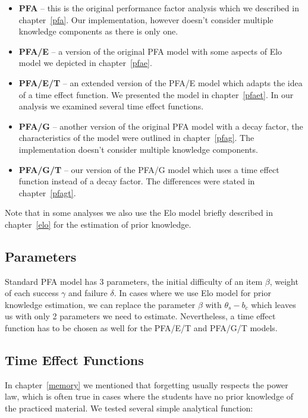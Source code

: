 \begin{itemize}
  \item \textbf{PFA} -- this is the original performance factor analysis which we described in chapter~\ref{pfa}. Our implementation, however doesn't consider multiple knowledge components as there is only one.
  \item \textbf{PFA/E} -- a version of the original PFA model with some aspects of Elo model we depicted in chapter~\ref{pfae}.
  \item \textbf{PFA/E/T} -- an extended version of the PFA/E model which adapts the idea of a time effect function. We presented the model in chapter~\ref{pfaet}. In our analysis we examined several time effect functions.
  \item \textbf{PFA/G} -- another version of the original PFA model with a decay factor, the characteristics of the model were outlined in chapter~\ref{pfag}. The implementation doesn't consider multiple knowledge components.
  \item \textbf{PFA/G/T} -- our version of the PFA/G model which uses a time effect function instead of a decay factor. The differences were stated in chapter~\ref{pfagt}.
\end{itemize}

Note that in some analyses we also use the Elo model briefly described in chapter~\ref{elo} for the estimation of prior knowledge.

\subsection{Parameters}

Standard PFA model has 3 parameters, the initial difficulty of an item $\beta$, weight of each success $\gamma$ and failure $\delta$. In cases where we use Elo model for prior knowledge estimation, we can replace the parameter $\beta$ with $\theta_s - b_c$ which leaves us with only 2 parameters we need to estimate. Nevertheless, a time effect function has to be chosen as well for the PFA/E/T and PFA/G/T models.

\subsection*{Time Effect Functions}

In chapter~\ref{memory} we mentioned that forgetting usually respects the power law, which is often true in cases where the students have no prior knowledge of the practiced material. We tested several simple analytical function:


